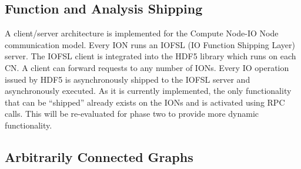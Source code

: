 \documentclass[conference]{IEEEtran}
\newcommand{\DDTns}{D\textsuperscript{2}T}
\begin{document}
%

\subsection{Function and Analysis Shipping}
\label{sec:fn-shipping}

A client/server architecture is implemented for the Compute Node-IO Node
communication model.  Every ION runs an IOFSL (IO Function Shipping Layer)
server. The IOFSL client is integrated into the HDF5 library which runs on each
CN. A client can forward requests to any number of IONs. Every IO operation
issued by HDF5 is asynchronously shipped to the IOFSL server and asynchronously
executed. As it is currently implemented, the only functionality that can be
``shipped'' already exists on the IONs and is activated using RPC calls. This
will be re-evaluated for phase two to provide more dynamic functionality.

\subsection{Arbitrarily Connected Graphs}
\label{sec:acg}
\end{document}
